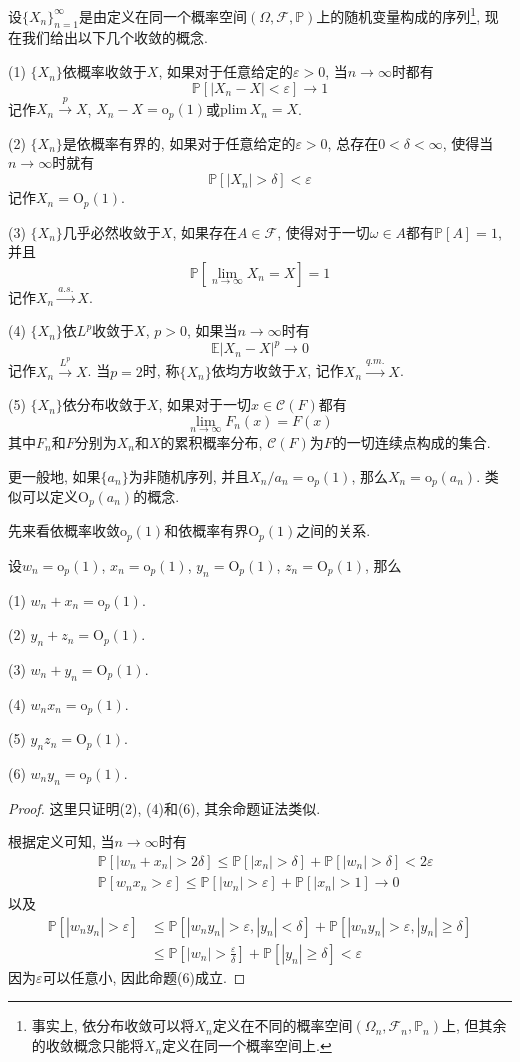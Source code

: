 \documentclass[cn, 12pt, math=mtpro2, bibstyle=apa, blue, twocol]{elegantbook}
\newcommand{\F}{\mathscr{F}}
\newcommand{\E}{\mathbb{E}}
\newcommand{\PP}{\mathbb{P}}
\begin{document}
设$\{X_n\}_{n=1}^\infty$是由定义在同一个概率空间$(\Omega,\F,\PP)$上的随机变量构成的序列\footnote{事实上, 依分布收敛可以将$X_n$定义在不同的概率空间$(\Omega_n,\F_n,\PP_n)$上, 但其余的收敛概念只能将$X_n$定义在同一个概率空间上.}, 现在我们给出以下几个收敛的概念.
\begin{definition}
(1) $\{X_n\}$依概率收敛于$X$, 如果对于任意给定的$\varepsilon>0$, 当$n\to\infty$时都有
$$\PP[|X_n-X|<\varepsilon]\to1$$
记作$X_n\xrightarrow{p}X$, $X_n-X=\text{o}_p(1)$或$\text{plim}\,X_n=X$.

(2) $\{X_n\}$是依概率有界的, 如果对于任意给定的$\varepsilon>0$, 总存在$0<\delta<\infty$, 使得当$n\to\infty$时就有
$$\PP[|X_n|>\delta]<\varepsilon$$
记作$X_n=\text{O}_p(1)$.

(3) $\{X_n\}$几乎必然收敛于$X$, 如果存在$A\in\F$, 使得对于一切$\omega\in A$都有$\PP[A]=1$, 并且
$$\PP\left[\lim_{n\to\infty}X_n=X\right]=1$$
记作$X_n\xrightarrow{a.s.}X$.

(4) $\{X_n\}$依$L^p$收敛于$X$, $p>0$, 如果当$n\to\infty$时有
$$\E|X_n-X|^p\to0$$
记作$X_n\xrightarrow{L^p}X$. 当$p=2$时, 称$\{X_n\}$依均方收敛于$X$, 记作$X_n\xrightarrow{q.m.}X$.

(5) $\{X_n\}$依分布收敛于$X$, 如果对于一切$x\in\mathscr{C}(F)$都有
$$\lim_{n\to\infty}F_n(x)=F(x)$$
其中$F_n$和$F$分别为$X_n$和$X$的累积概率分布, $\mathscr{C}(F)$为$F$的一切连续点构成的集合.
\end{definition}
\begin{remark}
更一般地, 如果$\{a_n\}$为非随机序列, 并且$X_n/a_n=\text{o}_p(1)$, 那么$X_n=\text{o}_p(a_n)$. 类似可以定义$\text{O}_p(a_n)$的概念.
\end{remark}
先来看依概率收敛$\text{o}_p(1)$和依概率有界$\text{O}_p(1)$之间的关系.
\begin{theorem}
  设$w_n=\text{o}_p(1)$, $x_n=\text{o}_p(1)$, $y_n=\text{O}_p(1)$, $z_n=\text{O}_p(1)$, 那么

  (1) $w_n+x_n=\text{o}_p(1)$.

  (2) $y_n+z_n=\text{O}_p(1)$.

  (3) $w_n+y_n=\text{O}_p(1)$.

  (4) $w_nx_n=\text{o}_p(1)$.

  (5) $y_nz_n=\text{O}_p(1)$.

  (6) $w_ny_n=\text{o}_p(1)$.
\end{theorem}
\begin{proof}
这里只证明(2), (4)和(6), 其余命题证法类似.

根据定义可知, 当$n\to\infty$时有
\begin{align*}
  &\PP[|w_n+x_n|>2\delta]\leq \PP[|x_n|>\delta]+\PP[|w_n|>\delta]<2\varepsilon \\
  &\PP[w_nx_n>\varepsilon]\leq \PP[|w_n|>\varepsilon]+\PP[|x_n|>1]\to0
\end{align*}
以及
\begin{align*}
\PP[|w_ny_n|>\varepsilon]&\leq \PP[|w_ny_n|>\varepsilon, |y_n|<\delta]+\PP[|w_ny_n|>\varepsilon, |y_n|\geq\delta] \\
&\leq\PP\left[|w_n|>\frac{\varepsilon}{\delta}\right]+\PP[|y_n|\ge\delta]<\varepsilon
\end{align*}
因为$\varepsilon$可以任意小, 因此命题(6)成立.
\end{proof}
\end{document}
